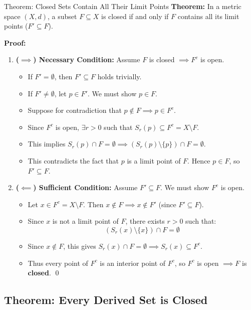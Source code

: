 \documentclass[11pt,a4paper]{article}
\begin{document}
\begin{exbox}{Theorem: Closed Sets Contain All Their Limit Points}
\textbf{Theorem:} In a metric space $(X, d)$, a subset $F \subseteq X$ is closed if and only if $F$ contains all its limit points ($F' \subseteq F$).

\textbf{Proof:}
\begin{enumerate}
    \item \textbf{($\implies$) Necessary Condition:} Assume $F$ is closed $\implies F^c$ is open.
    \begin{itemize}
        \item If $F' = \emptyset$, then $F' \subseteq F$ holds trivially.
        \item If $F' \neq \emptyset$, let $p \in F'$. We must show $p \in F$.
        \item Suppose for contradiction that $p \notin F \implies p \in F^c$.
        \item Since $F^c$ is open, $\exists r > 0$ such that $S_r(p) \subseteq F^c = X \setminus F$.
        \item This implies $S_r(p) \cap F = \emptyset \implies (S_r(p) \setminus \{p\}) \cap F = \emptyset$.
        \item This contradicts the fact that $p$ is a limit point of $F$. Hence $p \in F$, so $F' \subseteq F$.
    \end{itemize}
    \item \textbf{($\impliedby$) Sufficient Condition:} Assume $F' \subseteq F$. We must show $F^c$ is open.
    \begin{itemize}
        \item Let $x \in F^c = X \setminus F$. Then $x \notin F \implies x \notin F'$ (since $F' \subseteq F$).
        \item Since $x$ is not a limit point of $F$, there exists $r > 0$ such that:
        $$(S_r(x) \setminus \{x\}) \cap F = \emptyset$$
        \item Since $x \notin F$, this gives $S_r(x) \cap F = \emptyset \implies S_r(x) \subseteq F^c$.
        \item Thus every point of $F^c$ is an interior point of $F^c$, so $F^c$ is open $\implies F$ is \textbf{closed}. \qed
    \end{itemize}
\end{enumerate}
\end{exbox}

\newpage

\subsection{Theorem: Every Derived Set is Closed}
\end{document}
